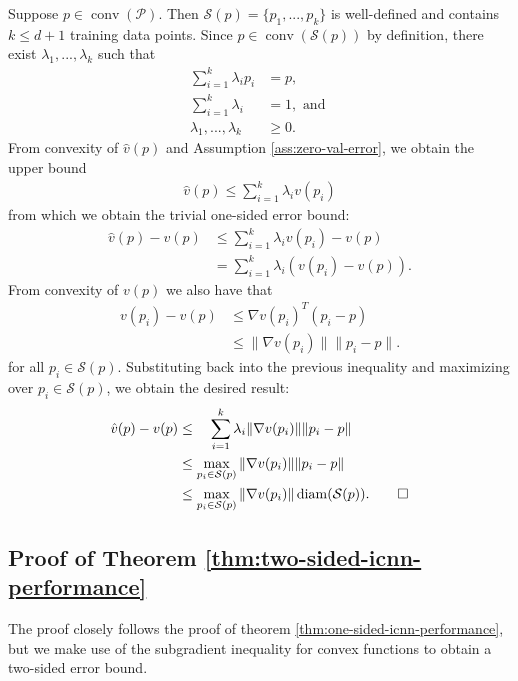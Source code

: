 \documentclass[10pt]{article} %
\theoremstyle{plain}
\theoremstyle{definition}
\theoremstyle{remark}
\begin{document}
Suppose $p \in \operatorname{conv}(\mathcal{P})$. Then $\mathcal{S}(p) = \{p_1, ..., p_k\}$ is well-defined and contains $k \leq d+1$ training data points. Since $p \in \operatorname{conv}(\mathcal{S}(p))$ by definition, there exist $\lambda_1, ..., \lambda_k$ such that
\begin{align}
    \sum_{i=1}^{k} \lambda_i p_i &= p, \\
    \sum_{i=1}^{k} \lambda_i &= 1, \text{ and } \\
    \lambda_1, ..., \lambda_k &\geq 0.
\end{align}
From convexity of $\hat{v}(p)$ and Assumption \ref{ass:zero-val-error}, we obtain the upper bound
\begin{align*}
    \hat{v}(p) \leq \sum_{i=1}^{k} \lambda_i v(p_i)
\end{align*}
from which we obtain the trivial one-sided error bound:
\begin{align*}
\hat{v}(p) - v(p) &\leq \sum_{i=1}^{k} \lambda_i v(p_i) - v(p) \\
& = \sum_{i=1}^{k} \lambda_i (v(p_i) - v(p)).
\end{align*}
From convexity of $v(p)$ we also have that
\begin{align*}
    v(p_i) - v(p) &\leq \nabla v(p_i)^T(p_i - p) \\
    &\leq \| \nabla v(p_i) \| \|p_i - p \|.
\end{align*}
for all $p_i \in \mathcal{S}(p)$. Substituting back into the previous inequality and maximizing over $p_i \in \mathcal{S}(p)$, we obtain the desired result:
\begin{align*}
    \hat{v}(p) - v(p) &\leq \quad \sum_{i=1}^{k} \lambda_i\|\nabla v(p_i)\| \|p_i - p \|  \\
    &\leq \max_{p_i \in \mathcal{S}(p)} \|\nabla v(p_i)\| \|p_i - p \| \\
    &\leq \max_{p_i \in \mathcal{S}(p)} \|\nabla v(p_i)\| \operatorname{diam}(\mathcal{S}(p)). \qed
\end{align*}

\subsection{Proof of Theorem \ref{thm:two-sided-icnn-performance}} \label{app:thm-two-sided}

The proof closely follows the proof of theorem \ref{thm:one-sided-icnn-performance}, but we make use of the subgradient inequality for convex functions to obtain a two-sided error bound.
\end{document}
